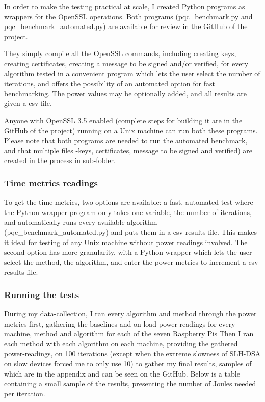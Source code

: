 \documentclass[11pt, letterpaper]{article}
\begin{document}
In order to make the testing practical at scale, I created Python programs as wrappers for the OpenSSL operations. Both programs (pqc\_benchmark.py and pqc\_benchmark\_automated.py) are available for review in the GitHub of the project.

They simply compile all the OpenSSL commands, including creating keys, creating certificates, creating a message to be signed and/or verified, for every algorithm tested in a convenient program which lets the user select the number of iterations, and offers the possibility of an automated option for fast benchmarking. The power values may be optionally added, and all results are given a csv file.

Anyone with OpenSSL 3.5 enabled (complete steps for building it are in the GitHub of the project) running on a Unix machine can run both these programs. Please note that both programs are needed to run the automated benchmark, and that multiple files -keys, certificates, message to be signed and verified) are created in the process in sub-folder.

\subsubsection{Time metrics readings}

To get the time metrics, two options are available: a fast, automated test where the Python wrapper program only takes one variable, the number of iterations, and automatically runs every available algorithm (pqc\_benchmark\_automated.py) and puts them in a csv results file. This makes it ideal for testing of any Unix machine without power readings involved. The second option has more granularity, with a Python wrapper which lets the user select the method, the algorithm, and enter the power metrics to increment a csv results file.

\subsubsection{Running the tests}

During my data-collection, I ran every algorithm and method through the power metrics first, gathering the baselines and on-load power readings for every machine, method and algorithm for each of the seven Raspberry Pis
Then I ran each method with each algorithm on each machine, providing the gathered power-readings, on 100 iterations (except when the extreme slowness of SLH-DSA on slow devices forced me to only use 10) to gather my final results, samples of which are in the appendix and can be seen on the GitHub. Below is a table containing a small sample of the results, presenting the number of Joules needed per iteration.
\end{document}
